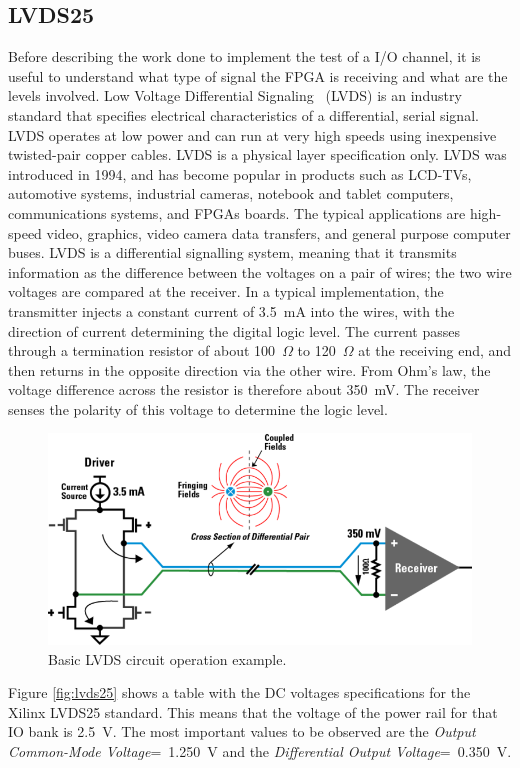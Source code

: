 \subsection{LVDS25}
Before describing the work done to implement the test of a I/O channel, it is useful to understand what type of signal the FPGA is receiving and what are the levels involved.
Low Voltage Differential Signaling~\cite{lvds} (LVDS) is an industry standard that specifies electrical characteristics of a differential, serial signal.
LVDS operates at low power and can run at very high speeds using inexpensive twisted-pair copper cables. LVDS is a physical layer specification only.
LVDS was introduced in 1994, and has become popular in products such as LCD-TVs, automotive systems, industrial cameras, notebook and tablet computers, communications systems, and FPGAs boards. The typical applications are high-speed video, graphics, video camera data transfers, and general purpose computer buses.
LVDS is a differential signalling system, meaning that it transmits information as the difference between the voltages on a pair of wires; the two wire voltages are compared at the receiver.
In a typical implementation, the transmitter injects a constant current of 3.5~mA into the wires, with the direction of current determining the digital logic level. The current passes through a termination resistor of about 100~$\Omega$ to 120~$\Omega$ at the receiving end, and then returns in the opposite direction via the other wire. From Ohm's law, the voltage difference across the resistor is therefore about 350~mV. The receiver senses the polarity of this voltage to determine the logic level.
\begin{figure}[H]
	\centering
	\includegraphics[width=0.7\linewidth]{IMG/ch3/LVDS}
	\caption{Basic LVDS circuit operation example.}
	\label{fig:lvds}
\end{figure}
\noindent Figure \ref{fig:lvds25} shows a table with the DC voltages specifications for the Xilinx LVDS25 standard.
This means that the voltage of the power rail for that IO bank is 2.5~V.
The most important values to be observed are the \textit{Output Common-Mode Voltage}=~1.250~V and the \textit{Differential Output Voltage}=~0.350~V.
